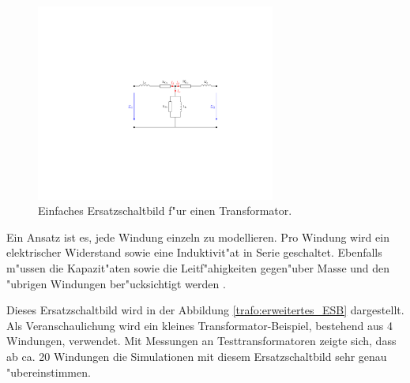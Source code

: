 \begin{refsection}
\begin{figure}
	\centering
	\includegraphics[width=0.7\textwidth]{./trafo/images/Einfaches_ESB.pdf}
	\caption[Einfaches Ersatzschaltbild f"ur einen Transformator]{Einfaches Ersatzschaltbild f"ur einen Transformator.}
	\label{trafo:einfaches_ESB}
\end{figure}

Ein Ansatz ist es, jede Windung einzeln zu modellieren. Pro Windung wird ein elektrischer Widerstand sowie eine Induktivit"at in Serie geschaltet. Ebenfalls m"ussen die Kapazit"aten sowie die Leitf"ahigkeiten gegen"uber Masse und den "ubrigen Windungen ber"ucksichtigt werden \cite{trafo:BILImpulse}. 

Dieses Ersatzschaltbild wird in der Abbildung \ref{trafo:erweitertes_ESB} dargestellt. Als Veranschaulichung wird ein kleines Transformator-Beispiel, bestehend aus 4 Windungen, verwendet. Mit Messungen an Testtransformatoren zeigte sich, dass ab ca. 20 Windungen die Simulationen mit diesem Ersatzschaltbild sehr genau "ubereinstimmen. 


\end{refsection}
